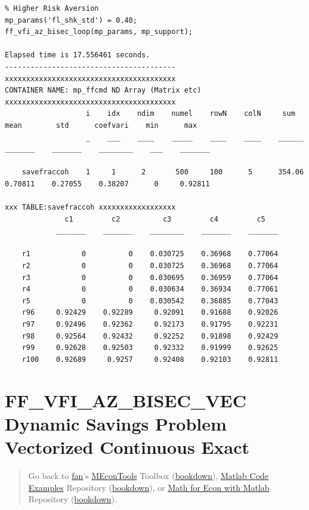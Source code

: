 \documentclass[
]{book}
\begin{document}
\begin{verbatim}
% Higher Risk Aversion
mp_params('fl_shk_std') = 0.40;
ff_vfi_az_bisec_loop(mp_params, mp_support);

Elapsed time is 17.556461 seconds.
----------------------------------------
xxxxxxxxxxxxxxxxxxxxxxxxxxxxxxxxxxxxxxxx
CONTAINER NAME: mp_ffcmd ND Array (Matrix etc)
xxxxxxxxxxxxxxxxxxxxxxxxxxxxxxxxxxxxxxxx
                   i    idx    ndim    numel    rowN    colN     sum       mean        std      coefvari    min      max  
                   _    ___    ____    _____    ____    ____    ______    _______    _______    ________    ___    _______

    savefraccoh    1     1      2       500     100      5      354.06    0.70811    0.27055    0.38207      0     0.92811

xxx TABLE:savefraccoh xxxxxxxxxxxxxxxxxx
              c1         c2          c3         c4         c5   
            _______    _______    ________    _______    _______

    r1            0          0    0.030725    0.36968    0.77064
    r2            0          0    0.030725    0.36968    0.77064
    r3            0          0    0.030695    0.36959    0.77064
    r4            0          0    0.030634    0.36934    0.77061
    r5            0          0    0.030542    0.36885    0.77043
    r96     0.92429    0.92289     0.92091    0.91688    0.92026
    r97     0.92496    0.92362     0.92173    0.91795    0.92231
    r98     0.92564    0.92432     0.92252    0.91898    0.92429
    r99     0.92628    0.92503     0.92332    0.91999    0.92625
    r100    0.92689     0.9257     0.92408    0.92103    0.92811
\end{verbatim}

\hypertarget{ff_vfi_az_bisec_vec-dynamic-savings-problem-vectorized-continuous-exact}{%
\section{FF\_VFI\_AZ\_BISEC\_VEC Dynamic Savings Problem Vectorized Continuous Exact}\label{ff_vfi_az_bisec_vec-dynamic-savings-problem-vectorized-continuous-exact}}

\begin{quote}
Go back to \href{http://fanwangecon.github.io/}{fan}'s \href{https://fanwangecon.github.io/MEconTools/}{MEconTools} Toolbox (\href{https://fanwangecon.github.io/MEconTools/bookdown}{bookdown}), \href{https://fanwangecon.github.io/M4Econ/}{Matlab Code Examples} Repository (\href{https://fanwangecon.github.io/M4Econ/bookdown}{bookdown}), or \href{https://fanwangecon.github.io/Math4Econ/}{Math for Econ with Matlab} Repository (\href{https://fanwangecon.github.io/Math4Econ/bookdown}{bookdown}).
\end{quote}
\end{document}
